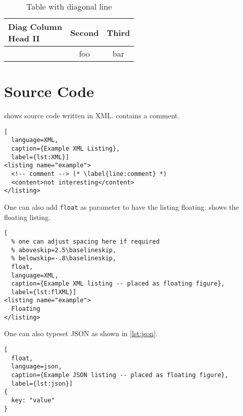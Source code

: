 \documentclass[
  numbers=noenddot,
  english,  %
  a4paper,  %
  twoside,  %
  bibliography=totoc,
  headsepline,
  cleardoublepage=empty,
  parskip=half,
  draft=false
]{scrbook}
\theoremstyle{break}
\begin{document}
\begin{ltgexample}
\begin{table}
  \caption{Table with diagonal line}
  \label{tab:diag}
  \begin{center}
    \begin{tabular}{|l|c|c|}
      \hline
      \diagbox[width=10em]{Diag \\Column Head I}{Diag Column\\Head II} & Second & Third \\
      \hline
       & foo & bar              \\
      \hline
    \end{tabular}
  \end{center}
\end{table}
\end{ltgexample}


\section{Source Code}

\begin{ltgexample}
 shows source code written in XML.
 contains a comment.

\begin{lstlisting}[
  language=XML,
  caption={Example XML Listing},
  label={lst:XML}]
<listing name="example">
  <!-- comment --> (* \label{line:comment} *)
  <content>not interesting</content>
</listing>
\end{lstlisting}
\end{ltgexample}

One can also add \verb+float+ as parameter to have the listing floating.
 shows the floating listing.

\begin{ltgexample}
\begin{lstlisting}[
  % one can adjust spacing here if required
  % aboveskip=2.5\baselineskip,
  % belowskip=-.8\baselineskip,
  float,
  language=XML,
  caption={Example XML listing -- placed as floating figure},
  label={lst:flXML}]
<listing name="example">
  Floating
</listing>
\end{lstlisting}
\end{ltgexample}

One can also typeset JSON as shown in \cref{lst:json}.

\begin{ltgexample}
\begin{lstlisting}[
  float,
  language=json,
  caption={Example JSON listing -- placed as floating figure},
  label={lst:json}]
{
  key: "value"
}
\end{lstlisting}
\end{ltgexample}
\end{document}
